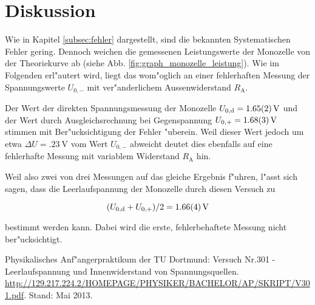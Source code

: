 \section{Diskussion}
\label{diskussion}
	Wie in Kapitel \ref{subsec:fehler} dargestellt, sind die bekannten Systematischen Fehler gering.
	Dennoch weichen die gemessenen Leistungswerte der Monozelle von der Theoriekurve ab (siehe Abb. \ref{fig:graph_monozelle_leistung}).
	Wie im Folgenden erl"autert wird, liegt das wom"oglich an einer fehlerhaften Messung der Spannungswerte $U_{0,-}$ mit ver"anderlichem Aussenwiderstand $R_\mathrm{A}$.

	Der Wert der direkten Spannungsmessung der Monozelle $U_{0,\mathrm{d}} = \SI{1.65 (2)}{\volt}$ und der Wert durch Ausgleichsrechnung bei Gegenspannung $U_{0,+} = \SI{1.68 (3)}{\volt}$ stimmen mit Ber"ucksichtigung der Fehler "uberein.
	Weil dieser Wert jedoch um etwa $\Delta U = \SI{.23}{\volt}$ vom Wert $U_{0,-}$ abweicht deutet dies ebenfalls auf eine fehlerhafte Messung mit variablem Widerstand $R_\mathrm{A}$ hin.

	Weil also zwei von drei Messungen auf das gleiche Ergebnis f"uhren, l"asst sich sagen, dass die Leerlaufspannung der Monozelle durch diesen Versuch zu

	\begin{equation*}
		(U_{0,\mathrm{d}} + U_{0,+}) / 2 = \SI{1.66 (4)}{\volt}
	\end{equation*}

	bestimmt werden kann. Dabei wird die erste, fehlerbehaftete Messung nicht ber"ucksichtigt.

	\enlargethispage{3cm}

\begin{thebibliography}{9}
	 Physikalisches Anf"angerpraktikum der TU Dortmund: Versuch Nr.301 - Leerlaufspannung und Innenwiderstand von Spannungsquellen. \url{http://129.217.224.2/HOMEPAGE/PHYSIKER/BACHELOR/AP/SKRIPT/V301.pdf}. Stand: Mai 2013.
\end{thebibliography}
